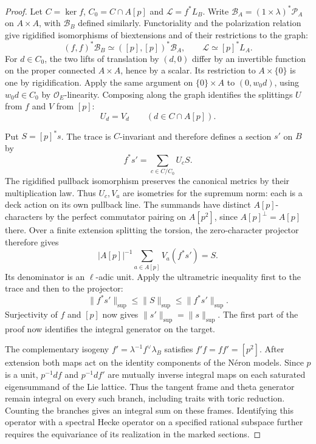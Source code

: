 \begin{proof}
Let \(C=\ker f\), \(C_0=C\cap A[p]\) and \(\mathcal L=f^*L_B\).
Write \(\mathcal B_A=(1\times\lambda)^*\mathcal P_A\) on
\(A\times A\), with \(\mathcal B_B\) defined similarly.
Functoriality and the polarization relation give rigidified
isomorphisms of biextensions and of their restrictions to the graph:
\[
 (f,f)^*\mathcal B_B\simeq([p],[p])^*\mathcal B_A,\qquad
             \mathcal L\simeq[p]^*L_A.
\]
For \(d\in C_0\), the two lifts of translation by \((d,0)\)
differ by an invertible function on the proper connected
\(A\times A\), hence by a scalar. Its restriction to
\(A\times\{0\}\) is one by rigidification. Apply the same
argument on \(\{0\}\times A\) to \((0,w_0d)\), using
\(w_0d\in C_0\) by \(\mathcal O_E\)-linearity. Composing along
the graph identifies the splittings \(U\) from \(f\) and \(V\)
from \([p]\):
\[
                    U_d=V_d\qquad(d\in C\cap A[p]).
\]

Put \(S=[p]^*s\). The trace is \(C\)-invariant and therefore
defines a section \(s'\) on \(B\) by
\[
                       f^*s'=\sum_{c\in C/C_0}U_cS .
\]
The rigidified pullback isomorphism preserves the canonical metrics
by their multiplication law. Thus \(U_c,V_a\) are isometries for
the supremum norm: each is a deck action on its own pullback line.
The summands have distinct \(A[p]\)-characters by the perfect
commutator pairing on \(A[p^2]\), since \(A[p]^\perp=A[p]\) there.
Over a finite extension splitting the torsion, the zero-character
projector therefore gives
\[
        |A[p]|^{-1}\sum_{a\in A[p]}V_a(f^*s')=S .
\]
Its denominator is an \(\ell\)-adic unit. Apply the ultrametric
inequality first to the trace and then to the projector:
\[
 \|f^*s'\|_{\sup}\le\|S\|_{\sup}\le\|f^*s'\|_{\sup}.
\]
Surjectivity of \(f\) and \([p]\) now gives
\(\|s'\|_{\sup}=\|s\|_{\sup}\). The first part of the proof now identifies the
integral generator on the target.

The complementary isogeny
\(f'=\lambda^{-1}f^\vee\lambda_B\) satisfies \(f'f=ff'=[p^2]\).
After extension both maps act on the identity components of the
N\'eron models. Since \(p\) is a unit, \(p^{-1}df\) and
\(p^{-1}df'\) are mutually inverse integral maps on each saturated
eigensummand of the Lie lattice. Thus the tangent frame and theta
generator remain integral on every such branch, including traits
with toric reduction. Counting the branches gives an integral sum
on these frames. Identifying this operator with a spectral Hecke
operator on a specified rational subspace further requires the
equivariance of its realization in the marked sections.
\end{proof}

